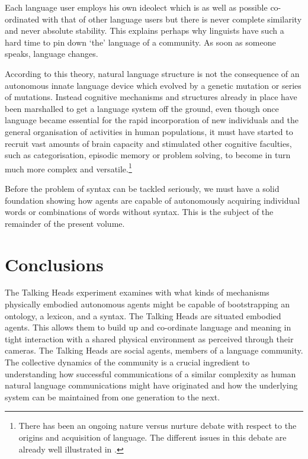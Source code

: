 Each language user employs his own ideolect which is 
as well as possible co-ordinated with that of other
language users but there is never complete similarity 
and never absolute stability.  
This explains perhaps why linguists have such a hard
time to pin down `the' language of a community. As soon 
as someone speaks, language changes. 

According to this theory, natural language structure is
not the consequence of an 
autonomous innate language device which evolved 
by a genetic mutation or series of mutations. Instead 
cognitive mechanisms and structures already in place have been 
marshalled to get a language system off the ground, even though 
once language became essential for the rapid incorporation
of new individuals and the general organisation of 
activities in human populations, it must have started
to recruit vast amounts of brain capacity and stimulated 
other cognitive faculties, such as categorisation,
episodic memory or problem solving, to become in turn 
much more complex and versatile.\footnote{
There has been an ongoing nature versus nurture debate 
with respect to the origins and acquisition of language. 
The different issues in this debate are already well
illustrated in \cite{Piattelli:1980}.} 

Before the problem of syntax can 
be tackled seriously, we must have a solid foundation showing 
how agents are capable of autonomously acquiring individual words
or combinations of words without syntax. This is the subject of the
remainder of the present volume.

\section{Conclusions}

The Talking Heads experiment examines with what kinds
of mechanisms physically embodied autonomous agents 
might be capable of bootstrapping an ontology, a lexicon, 
and a syntax. The Talking Heads are situated embodied
agents. This 
allows them to build up and co-ordinate language and meaning 
in tight interaction with a shared physical environment
as perceived through their cameras. 
The Talking Heads are social agents, members of a
language community. The collective
dynamics of the community is a crucial ingredient to understanding
how successful communications of a similar complexity as
human natural language communications might have 
originated and how the underlying system can 
be maintained from one generation to the next. 

